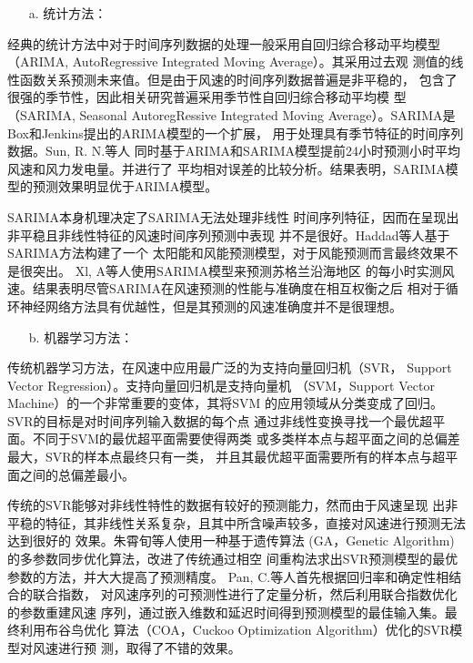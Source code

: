 \documentclass[AutoFakeBold]{LZUThesis}
\begin{document}
\begin{itemize}
\item[a. ] 统计方法：
\end{itemize}

经典的统计方法中对于时间序列数据的处理一般采用自回归综合移动平均模型
（ARIMA, AutoRegressive Integrated Moving Average）。其采用过去观
测值的线性函数关系预测未来值。但是由于风速的时间序列数据普遍是非平稳的，
包含了很强的季节性，因此相关研究普遍采用季节性自回归综合移动平均模
型（SARIMA, Seasonal AutoregRessive Integrated 
Moving Average）。SARIMA是Box和Jenkins提出的ARIMA模型的一个扩展，
用于处理具有季节特征的时间序列数据。Sun, R. N.等人
同时基于ARIMA和SARIMA模型提前24小时预测小时平均风速和风力发电量。并进行了
平均相对误差的比较分析。结果表明，SARIMA模型的预测效果明显优于ARIMA模型。

SARIMA本身机理决定了SARIMA无法处理非线性
时间序列特征，因而在呈现出非平稳且非线性特征的风速时间序列预测中表现
并不是很好。Haddad等人基于SARIMA方法构建了一个
太阳能和风能预测模型，对于风能预测而言最终效果不是很突出。
Xl, A等人使用SARIMA模型来预测苏格兰沿海地区
的每小时实测风速。结果表明尽管SARIMA在风速预测的性能与准确度在相互权衡之后
相对于循环神经网络方法具有优越性，但是其预测的风速准确度并不是很理想。

\begin{itemize}
\item[b. ] 机器学习方法：
\end{itemize}
 
传统机器学习方法，在风速中应用最广泛的为支持向量回归机（SVR，
Support Vector Regression）。支持向量回归机是支持向量机
（SVM，Support Vector Machine）的一个非常重要的变体，其将SVM
的应用领域从分类变成了回归。SVR的目标是对时间序列输入数据的每个点
通过非线性变换寻找一个最优超平面。不同于SVM的最优超平面需要使得两类
或多类样本点与超平面之间的总偏差最大，SVR的样本点最终只有一类，
并且其最优超平面需要所有的样本点与超平面之间的总偏差最小。

传统的SVR能够对非线性特性的数据有较好的预测能力，然而由于风速呈现
出非平稳的特征，其非线性关系复杂，且其中所含噪声较多，直接对风速进行预测无法达到很好的
效果。朱霄旬等人使用一种基于遗传算法
(GA，Genetic Algorithm)的多参数同步优化算法，改进了传统通过相空
间重构法求出SVR预测模型的最优参数的方法，并大大提高了预测精度。
Pan, C.等人首先根据回归率和确定性相结合的联合指数，
对风速序列的可预测性进行了定量分析，然后利用联合指数优化的参数重建风速
序列，通过嵌入维数和延迟时间得到预测模型的最佳输入集。最终利用布谷鸟优化
算法（COA，Cuckoo Optimization Algorithm）优化的SVR模型对风速进行预
测，取得了不错的效果。
\end{document}
